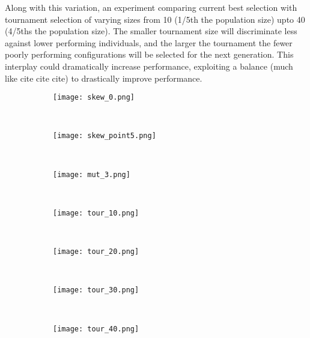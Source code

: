 Along with this variation, an experiment comparing current best
selection with tournament selection of varying sizes from 10 (1/5th the population
size) upto 40 (4/5ths the population size). The smaller tournament size
will discriminate less against lower performing individuals, and the
larger the tournament the fewer poorly performing configurations will
be selected for the next generation. This interplay could dramatically
increase performance, exploiting a balance (\todo much like cite cite cite)
to drastically improve performance.

\begin{figure}
	\begin{minipage}{\textwidth}
	\centering
	\begin{subfigure}[ht]{0.32\textwidth}
		\texttt{[image: skew\_0.png]}
		\caption{}
		\label{fig:skew_0}
		\vspace{1em}
	\end{subfigure}
	~
	\begin{subfigure}[ht]{0.32\textwidth}
		\texttt{[image: skew\_point5.png]}
		\caption{}
		\label{fig:skew_point5}
		\vspace{1em}
	\end{subfigure}
	~
	\begin{subfigure}[ht]{0.32\textwidth}
		\texttt{[image: mut\_3.png]}
		\caption{}
		\label{fig:skew_1}
		\vspace{1em}
	\end{subfigure}
	~
	\begin{subfigure}[ht]{0.49\textwidth}
		\texttt{[image: tour\_10.png]}
		\caption{}
		\label{fig:tour_10}
		\vspace{1em}
	\end{subfigure}
	~
	\begin{subfigure}[ht]{0.49\textwidth}
		\texttt{[image: tour\_20.png]}
		\caption{}
		\label{fig:tour_20}
		\vspace{1em}
	\end{subfigure}
	~
	\begin{subfigure}[ht]{0.49\textwidth}
		\texttt{[image: tour\_30.png]}
		\caption{}
		\label{fig:tour_30}
		\vspace{1em}
	\end{subfigure}
	~
	\begin{subfigure}[ht]{0.49\textwidth}
		\texttt{[image: tour\_40.png]}
		\caption{}
		\label{fig:tour_40}
		\vspace{1em}

\end{subfigure}
\end{minipage}
\end{figure}
